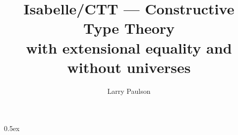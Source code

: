 \documentclass[11pt,a4paper]{article}
\begin{document}
\title{Isabelle/CTT --- Constructive Type Theory \\
  with extensional equality and without universes}
\author{Larry Paulson}
\maketitle

\tableofcontents

\parindent 0pt\parskip 0.5ex

\end{document}
